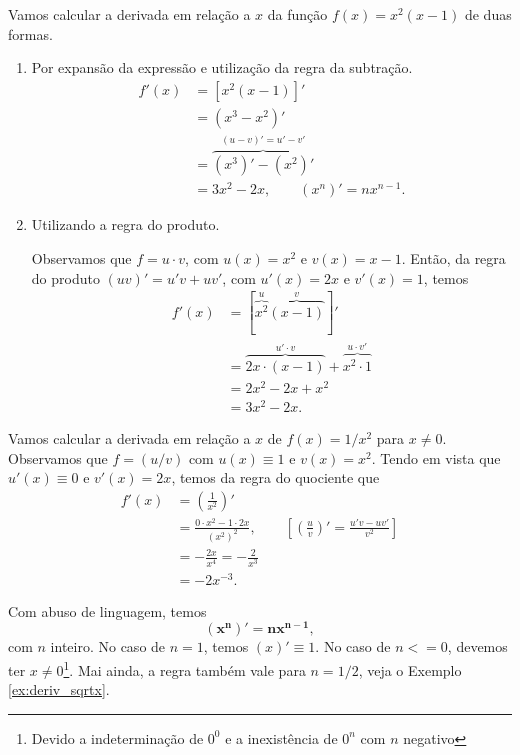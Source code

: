 \begin{ex}
  Vamos calcular a derivada em relação a $x$ da função $f(x) = x^2(x-1)$ de duas formas.
  \begin{enumerate}[1.]
  \item Por expansão da expressão e utilização da regra da subtração.
    \begin{align}
      f'(x) &= [x^2(x-1)]'\\
            &= (x^3-x^2)' \\
            &= \overbrace{(x^3)'-(x^2)'}^{(u-v)'=u'-v'}\\
            &= 3x^2-2x,\quad\quad(x^n)' = nx^{n-1}.
    \end{align}
  \item Utilizando a regra do produto.

    Observamos que $f = u\cdot v$, com $u(x) = x^2$ e $v(x) = x-1$. Então, da regra do produto $(uv)' = u'v + uv'$, com $u'(x) = 2x$ e $v'(x) = 1$, temos
    \begin{align}
      f'(x) &= [\overbrace{x^2}^{u}\overbrace{(x-1)}^{v}]'\\
            &= \overbrace{2x\cdot (x-1)}^{u'\cdot v} + \overbrace{x^2\cdot 1}^{u\cdot v'}\\
            &= 2x^2 - 2x + x^2\\
            &= 3x^2 - 2x.
    \end{align}
  \end{enumerate}
\end{ex}

\begin{ex}\label{ex:deriv_x-2}
  Vamos calcular a derivada em relação a $x$ de $f(x) = 1/x^2$ para $x\neq 0$. Observamos que $f = (u/v)$ com $u(x) \equiv 1$ e $v(x) = x^2$. Tendo em vista que $u'(x) \equiv 0$ e $v'(x) = 2x$, temos da regra do quociente que
  \begin{align}
    f'(x) &= \left(\frac{1}{x^2}\right)' \\
          &= \frac{0\cdot x^2 - 1\cdot 2x}{(x^2)^2},\quad\quad\left[\left(\frac{u}{v}\right)' = \frac{u'v-uv'}{v^2}\right]\\
          &= -\frac{2x}{x^4} = -\frac{2}{x^3}\\
          &= -2x^{-3}.
  \end{align}
\end{ex}

\begin{obs}
  Com abuso de linguagem, temos
  \begin{equation}
    \pmb{(x^n)' = nx^{n-1}},
  \end{equation}
  com $n$ inteiro. No caso de $n=1$, temos $(x)' \equiv 1$. No caso de $n <= 0$, devemos ter $x\neq 0$\footnote{Devido a indeterminação de $0^0$ e a inexistência de $0^n$ com $n$ negativo}. Mai ainda, a regra também vale para $n=1/2$, veja o Exemplo \ref{ex:deriv_sqrtx}. 
\end{obs}

